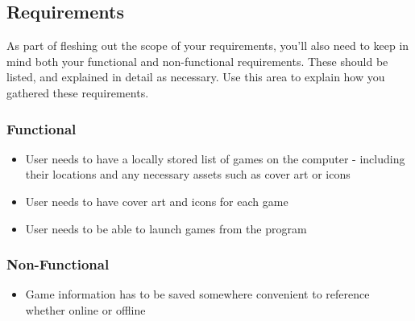 \documentclass[10pt,conference,onecolumn,compsoc]{IEEEtran}
\begin{document}
\subsection{Requirements}
As part of fleshing out the scope of your requirements, you'll also need to keep in mind both your functional and non-functional requirements.  These should be listed, and explained in detail as necessary.  Use this area to explain how you gathered these requirements.

\subsubsection{Functional}

\begin{itemize}
\item User needs to have a locally stored list of games on the computer - including their locations and any necessary assets such as cover art or icons
\item User needs to have cover art and icons for each game
\item User needs to be able to launch games from the program
\end{itemize}

\subsubsection{Non-Functional}

\begin{itemize}
\item Game information has to be saved somewhere convenient to reference whether online or offline 
\end{itemize}

%
%
%
\end{document}
